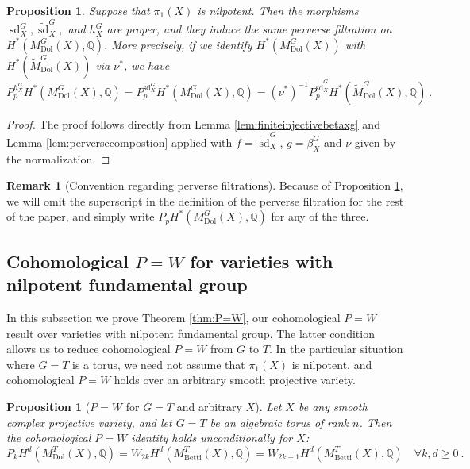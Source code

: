 \documentclass[11pt, a4paper]{amsart}
\newtheorem{proposition}[theorem]{Proposition}
\theoremstyle{definition}
\newtheorem{remark}[theorem]{Remark}
\theoremstyle{myitemstyle}
\newcommand{\Dol}{{\mathrm{Dol}}}
\newcommand{\Betti}{{\mathrm{Betti}}}
\newcommand{\sd}{{\operatorname{sd}}}
\begin{document}
\begin{proposition}\label{prop:allperverseequal}
Suppose that $\pi_1(X)$ is nilpotent. Then the morphisms $\sd_X^G,\widetilde \sd_X^G,$ and $h^G_X$ are proper, and they induce the same perverse filtration on $H^*(M_{\Dol}^G(X),\mathbb{Q})$. More precisely, if we identify $H^*(M_{\Dol}^G(X))$ with $H^*(\widetilde M_{\Dol}^G(X))$ via $\nu^*$, we have 
\[
    P_p^{h^G_X}H^*(M_{\Dol}^G(X),\mathbb{Q})=P_p^{\sd^G_X}H^*(M_{\Dol}^G(X),\mathbb{Q})=
    (\nu^*)^{-1}P_p^{\widetilde\sd^G_X}H^*(\widetilde M_{\Dol}^G(X),\mathbb{Q})\ .
\]
\end{proposition}
\begin{proof}
The proof follows directly from Lemma \ref{lem:finiteinjectivebetaxg} and Lemma \ref{lem:perversecompostion} applied with $f=\widetilde{\sd}^G_X$, $g=\beta_X^G$ and $\nu$ given by the normalization. 
\end{proof}

\begin{remark}[Convention regarding perverse filtrations]
    Because of Proposition \ref{prop:allperverseequal}, we will omit the superscript in the definition of the perverse filtration for the rest of the paper,  and simply write $P_pH^*(M_{\Dol}^G(X),\mathbb{Q})$ for any of the three. 
\end{remark}

\subsection{Cohomological $P=W$ for varieties with nilpotent fundamental group}

In  this subsection we prove Theorem \ref{thm:P=W}, our  cohomological $P=W$ result over varieties with nilpotent fundamental group. 
The latter condition allows us to reduce cohomological $P=W$ from $G$ to $T$. In the particular situation  where $G=T$ is a torus, we need not assume that $\pi_1(X)$ is nilpotent, and cohomological $P=W$ holds over an arbitrary smooth projective variety. 

\begin{proposition}[$P=W$ for $G =T$ and arbitrary $X$]
\label{prop:Pw_rank1_arbitrary}
Let $X$ be any smooth complex projective variety, and let $G = T$ be an algebraic torus of rank $n$. Then the cohomological $P=W$ identity holds unconditionally for $X$:
\[
P_k H^d(M_{\Dol}^{T}(X), \mathbb{Q}) = W_{2k} H^d(M_{\Betti}^{T}(X), \mathbb{Q}) = W_{2k+1} H^d(M_{\Betti}^{T}(X), \mathbb{Q}) \quad \forall k, d \ge 0\ .
\]
\end{proposition}
\end{document}
